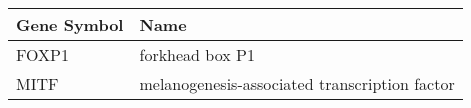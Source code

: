 \begin{tabular}{ll}
\toprule
Gene Symbol &                                          Name \\
\midrule
      FOXP1 &                               forkhead box P1 \\
       MITF & melanogenesis-associated transcription factor \\
\bottomrule
\end{tabular}
